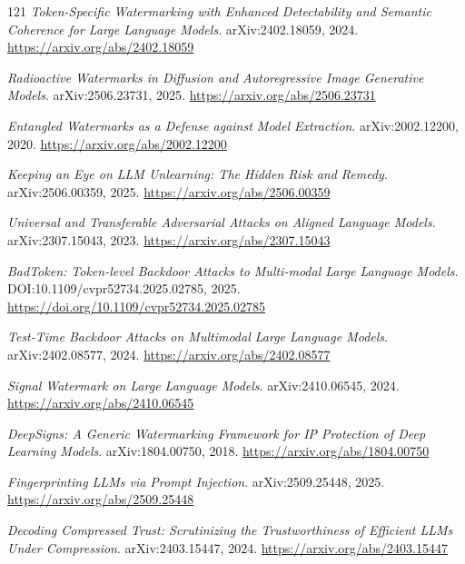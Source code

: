 \documentclass[11pt,a4paper]{article}
\begin{document}
\begin{thebibliography}{121}
\newblock \emph{Token-Specific Watermarking with Enhanced Detectability and Semantic Coherence for Large Language Models}.
\newblock arXiv:2402.18059, 2024.
\newblock \url{https://arxiv.org/abs/2402.18059}

\newblock \emph{Radioactive Watermarks in Diffusion and Autoregressive Image Generative Models}.
\newblock arXiv:2506.23731, 2025.
\newblock \url{https://arxiv.org/abs/2506.23731}

\newblock \emph{Entangled Watermarks as a Defense against Model Extraction}.
\newblock arXiv:2002.12200, 2020.
\newblock \url{https://arxiv.org/abs/2002.12200}

\newblock \emph{Keeping an Eye on LLM Unlearning: The Hidden Risk and Remedy}.
\newblock arXiv:2506.00359, 2025.
\newblock \url{https://arxiv.org/abs/2506.00359}

\newblock \emph{Universal and Transferable Adversarial Attacks on Aligned Language Models}.
\newblock arXiv:2307.15043, 2023.
\newblock \url{https://arxiv.org/abs/2307.15043}

\newblock \emph{BadToken: Token-level Backdoor Attacks to Multi-modal Large Language Models}.
\newblock DOI:10.1109/cvpr52734.2025.02785, 2025.
\newblock \url{https://doi.org/10.1109/cvpr52734.2025.02785}

\newblock \emph{Test-Time Backdoor Attacks on Multimodal Large Language Models}.
\newblock arXiv:2402.08577, 2024.
\newblock \url{https://arxiv.org/abs/2402.08577}

\newblock \emph{Signal Watermark on Large Language Models}.
\newblock arXiv:2410.06545, 2024.
\newblock \url{https://arxiv.org/abs/2410.06545}

\newblock \emph{DeepSigns: A Generic Watermarking Framework for IP Protection of Deep Learning Models}.
\newblock arXiv:1804.00750, 2018.
\newblock \url{https://arxiv.org/abs/1804.00750}

\newblock \emph{Fingerprinting LLMs via Prompt Injection}.
\newblock arXiv:2509.25448, 2025.
\newblock \url{https://arxiv.org/abs/2509.25448}

\newblock \emph{Decoding Compressed Trust: Scrutinizing the Trustworthiness of Efficient LLMs Under Compression}.
\newblock arXiv:2403.15447, 2024.
\newblock \url{https://arxiv.org/abs/2403.15447}


\end{thebibliography}
\end{document}
